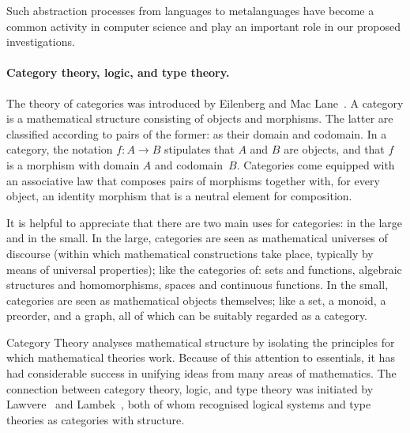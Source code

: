 \documentclass[11pt,twocolumn]{article}
\begin{document}
Such abstraction processes from languages to metalanguages have become a
common activity in computer science and play an important role in our
proposed investigations.  

\paragraph{Category theory, logic, and type theory.}

The theory of categories was introduced by Eilenberg and Mac
Lane~\cite{EilenbergMacLane}.  A category is a mathematical structure
consisting of objects and morphisms.  The latter are classified
according to pairs of the former: as their domain and codomain.  In a
category, the notation $f:A\to B$ stipulates that $A$ and $B$ are objects, and
that $f$ is a morphism with domain $A$ and codomain~$B$.  
Categories come equipped with an associative law that composes pairs of
morphisms 
together with, for every object, an identity morphism 
that is a neutral element for composition.  

It is helpful to appreciate that there are two main uses for categories: in the
large and in the small.  In the large, categories are seen as mathematical
universes of discourse (within which mathematical constructions take place,
typically by means of universal properties); like the categories of: sets and
functions, algebraic structures and homomorphisms, spaces and continuous
functions.  In the small, categories are seen as mathematical objects
themselves; like a set, a monoid, a preorder, and a graph, all of which can
be suitably regarded as a category.

Category Theory analyses mathematical structure by isolating the principles
for which mathematical theories work.  Because of this attention to
essentials, it has had considerable success in unifying ideas from many areas
of mathematics. 
%
The connection between category theory, logic, and type theory was
initiated by Lawvere~\cite{LawvereThesis} and Lambek~\cite{LambekI}, both
of whom recognised logical systems and type theories as categories with
structure.  
\end{document}
